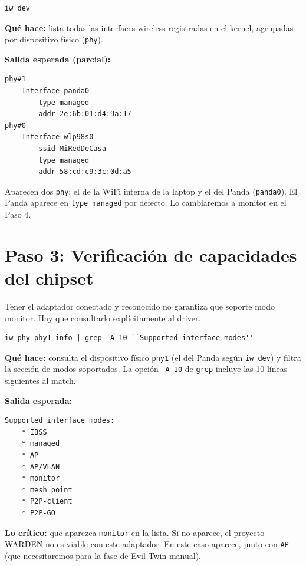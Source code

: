 \documentclass[11pt,a4paper]{article}
\begin{document}
\begin{lstlisting}
iw dev
\end{lstlisting}

\textbf{Qué hace:} lista todas las interfaces wireless registradas en el
kernel, agrupadas por dispositivo físico (\texttt{phy}).

\textbf{Salida esperada (parcial):}

\begin{lstlisting}
phy#1
    Interface panda0
        type managed
        addr 2e:6b:01:d4:9a:17
phy#0
    Interface wlp98s0
        ssid MiRedDeCasa
        type managed
        addr 58:cd:c9:3c:0d:a5
\end{lstlisting}

Aparecen dos \texttt{phy}: el de la WiFi interna de la laptop y el del
Panda (\texttt{panda0}). El Panda aparece en \texttt{type managed} por
defecto. Lo cambiaremos a monitor en el Paso 4.

\section{Paso 3: Verificación de capacidades del chipset}

Tener el adaptador conectado y reconocido no garantiza que soporte modo
monitor. Hay que consultarlo explícitamente al driver.

\begin{lstlisting}
iw phy phy1 info | grep -A 10 ``Supported interface modes''
\end{lstlisting}

\textbf{Qué hace:} consulta el dispositivo físico \texttt{phy1} (el del
Panda según \texttt{iw dev}) y filtra la sección de modos soportados. La
opción \texttt{-A 10} de \texttt{grep} incluye las 10 líneas siguientes
al match.

\textbf{Salida esperada:}

\begin{lstlisting}
Supported interface modes:
    * IBSS
    * managed
    * AP
    * AP/VLAN
    * monitor
    * mesh point
    * P2P-client
    * P2P-GO
\end{lstlisting}

\textbf{Lo crítico:} que aparezca \texttt{monitor} en la lista. Si no
aparece, el proyecto WARDEN no es viable con este adaptador. En este
caso aparece, junto con \texttt{AP} (que necesitaremos para la fase de
Evil Twin manual).
\end{document}
